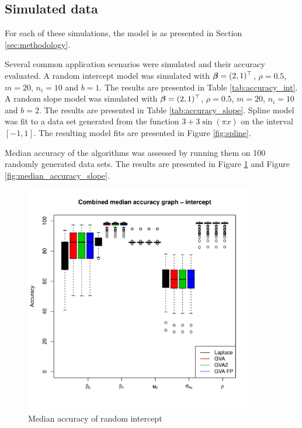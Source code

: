 \documentclass{article}[12pt]
\begin{document}
\subsection{Simulated data}

For each of these simulations, the model is as presented in Section \ref{sec:methodology}.

Several common application scenarios were simulated and their accuracy evaluated. A random intercept model was
simulated with ${\boldsymbol \beta} = (2, 1)^\top$, $\rho = 0.5$, $m = 20$, $n_i = 10$ and $b = 1$. The results are
presented in Table \ref{tab:accuracy_int}. A random slope model was simulated with ${\boldsymbol \beta} = (2, 1)^\top$,
$\rho = 0.5$, $m = 20$, $n_i = 10$ and $b = 2$. The results are presented in Table \ref{tab:accuracy_slope}.
Spline model was fit to a data set generated from the function $3 + 3 \sin{(\pi x)}$ on the interval $[-1,
1]$. The resulting model fits are presented in Figure \ref{fig:spline}.


Median accuracy of the algorithms was assessed by running them on 100 randomly generated data sets. The
results are presented in Figure \ref{fig:median_accuracy_intercept} and Figure
\ref{fig:median_accuracy_slope}.

\begin{figure}
\caption{Median accuracy of random intercept}
\label{fig:median_accuracy_intercept}
\includegraphics[width=100mm, height=100mm]{code/results/median_accuracy_combined_intercept.pdf}
\end{figure}
\end{document}

